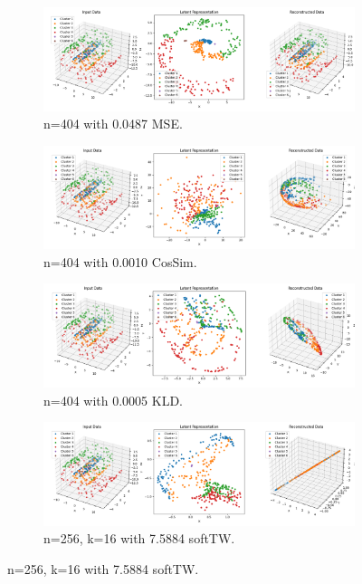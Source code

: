 \begin{figure}[htbp]
  \centering
  \begin{subfigure}[b]{1.0\textwidth}
    \centering
    \includegraphics[width=\linewidth]{images/RQ2/mse/3DSwissRoll_-1_0.0487.png}
    \caption{n=404 with 0.0487 MSE.}
    \label{fig:RQ2/mse/3DSwissRoll}
  \end{subfigure}
  \hfill
  \begin{subfigure}[b]{1.0\textwidth}
    \centering
    \includegraphics[width=\linewidth]{images/RQ2/csi/3DSwissRoll_2_0.0010.png}
    \caption{n=404 with 0.0010 CosSim.}
    \label{fig:RQ2/csi/3DSwissRoll}
  \end{subfigure}
  \hfill
  \begin{subfigure}[b]{1.0\textwidth}
    \centering
    \includegraphics[width=\linewidth]{images/RQ2/kld/3DSwissRoll_-1_0.0005.png}
    \caption{n=404 with 0.0005 KLD.}
    \label{fig:RQ2/kld/3DSwissRoll}
  \end{subfigure}
  \hfill
  \begin{subfigure}[b]{1.0\textwidth}
    \centering
    \includegraphics[width=\linewidth]{images/RQ2/tru/3DSwissRoll_256n_16k_7.5884.png}
    \caption{n=256, k=16 with 7.5884 softTW.}
    \label{fig:RQ2/tru/3DSwissRoll}
  \end{subfigure}


\end{figure}
